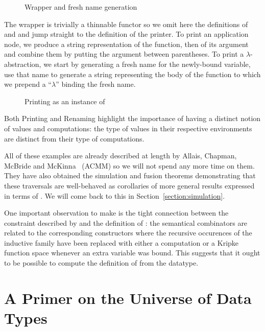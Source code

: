\begin{figure}[h]
\caption{Wrapper and fresh name generation}
\end{figure}

The wrapper  is trivially a thinnable functor so we omit here
the definitions of  and  and jump straight
to the definition of the printer. To print an application node, we produce
a string representation of the function, then of its argument and combine
them by putting the argument between parentheses. To print a $\lambda$-abstraction,
we start by generating a fresh name for the newly-bound variable, use that
name to generate a string representing the body of the function to which we
prepend a ``$\lambda$'' binding the fresh name.

\begin{figure}[h]
\caption{Printing as an instance of }
\end{figure}

Both Printing and Renaming highlight the importance of having a distinct
notion of values and computations: the type of values in their respective
environments are distinct from their type of computations.

All of these examples are already described at length by Allais, Chapman,
McBride and McKinna~\citeyear{allais2017type} (ACMM) so we will not spend any
more time on them. They have also obtained the simulation and fusion
theorems demonstrating that these traversals are well-behaved as
corollaries of more general results expressed in terms of .
We will come back to this in Section~\ref{section:simulation}.

One important observation to make is the tight connection between the
constraint described by  and the definition of : the
semantical combinators are related to the corresponding constructors
where the recursive occurences of the inductive family have been replaced
with either a computation or a Kripke function space whenever an
extra variable was bound. This suggests that it ought to be possible
to compute the definition of  from the datatype.




\section{A Primer on the Universe of Data Types}\label{sec:data}


